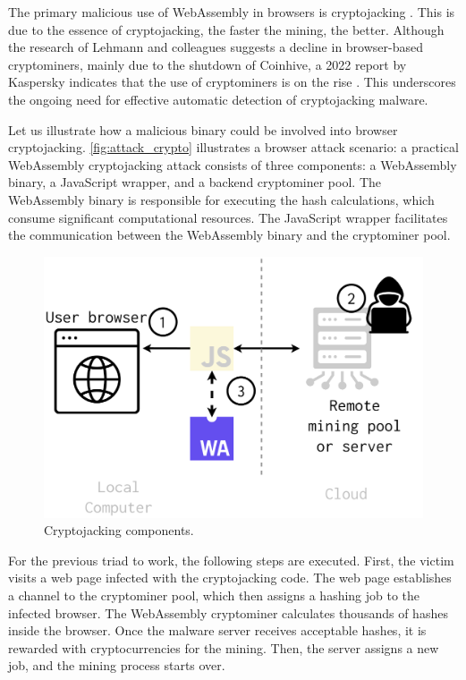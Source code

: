 
The primary malicious use of WebAssembly in browsers is cryptojacking \cite{musch2019new}. 
This is due to the essence of cryptojacking, the faster the mining, the better. 
Although the research of Lehmann and colleagues \cite{Hilbig2021AnES} suggests a decline in browser-based cryptominers, mainly due to the shutdown of Coinhive, a 2022 report by Kaspersky indicates that the use of cryptominers is on the rise \cite{kasperksy}. 
This underscores the ongoing need for effective automatic detection of cryptojacking malware.


Let us illustrate how a malicious \wasm binary could be involved into browser cryptojacking.
\autoref{fig:attack_crypto} illustrates a browser attack scenario:
a practical WebAssembly cryptojacking attack consists of three components: a WebAssembly binary, a JavaScript wrapper, and a backend cryptominer pool. 
The WebAssembly binary is responsible for executing the hash calculations, which consume significant computational resources. 
The JavaScript wrapper facilitates the communication between the WebAssembly binary and the cryptominer pool.

\begin{figure}[h]
    \centering
    \includegraphics[width=0.6\linewidth]{figures/attack_crypto.pdf}
    \caption{Cryptojacking components.}
    \label{fig:attack_crypto}
\end{figure}

For the previous triad to work, the following steps are executed.
First, the victim visits a web page infected with the cryptojacking code. 
The web page establishes a channel to the cryptominer pool, which then assigns a hashing job to the infected browser. 
The WebAssembly cryptominer calculates thousands of hashes inside the browser. 
Once the malware server receives acceptable hashes, it is rewarded with cryptocurrencies for the mining. 
Then, the server assigns a new job, and the mining process starts over.

